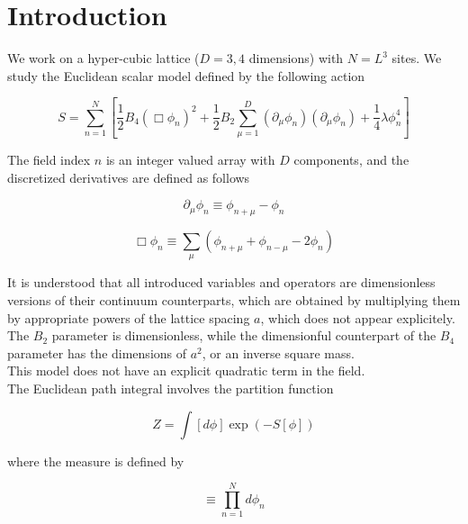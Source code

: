 \documentclass{article}
\begin{document}
\section{Introduction}

We work on a hyper-cubic lattice ($D=3, 4$ dimensions) with $N=L^3$ sites. We study the Euclidean scalar model defined by the following action

\begin{equation}
S = \sum_{n=1}^N \left[ \frac{1}{2} B_4 \left( \Box \phi_n \right)^2 + \frac{1}{2}B_2 \sum_{\mu=1}^D
  \left( \partial_\mu \phi_n \right) \left( \partial_\mu \phi_n \right) + \frac{1}{4}\lambda \phi_n^4 \right]
\end{equation}

\noindent The field index $n$ is an integer valued array with $D$ components, and the discretized derivatives are defined as follows

\begin{equation}
\partial_\mu \phi_n \equiv \phi_{n+\mu} - \phi_n
\end{equation}

\begin{equation}
\Box \phi_n \equiv \sum_\mu \left( \phi_{n+\mu} + \phi_{n-\mu} - 2\phi_n \right)
\end{equation}

\noindent It is understood that all introduced variables and operators are dimensionless versions of their continuum counterparts, which are obtained by multiplying them by appropriate
powers of the lattice spacing $a$, which does not appear explicitely. The $B_2$ parameter is dimensionless, while the dimensionful counterpart of the $B_4$ parameter has the dimensions of $a^{2}$, or an inverse square mass.\\

\noindent This model does not have an explicit quadratic term in the field.\\

\noindent The Euclidean path integral involves the partition function

\begin{equation}
Z = \int [d\phi] \exp \left( -S[\phi] \right)
\end{equation}

\noindent where the measure is defined by

\begin{equation}
[d\phi] \equiv \prod_{n=1}^N d\phi_n
\end{equation}
\end{document}
